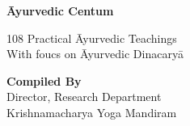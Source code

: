 \thispagestyle{empty}


\begin{center}
\textbf{\large Āyurvedic Centum}
\end{center}
\vfil

\begin{center}
108 Practical Āyurvedic Teachings\\
With foucs on Āyurvedic Dinacaryā
\end{center}
\vfill

\begin{center}
\textbf{Compiled By}\\
Director, Research Department\\
Krishnamacharya Yoga Mandiram
\end{center}
\eject

